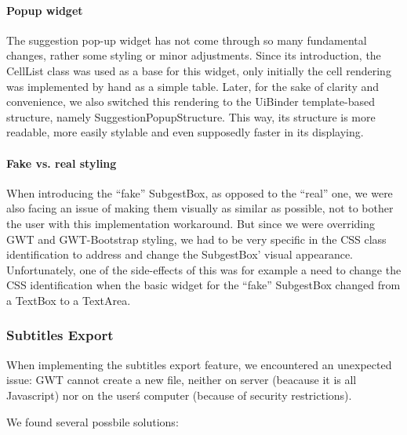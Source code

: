 \paragraph{Popup widget}
The suggestion pop-up widget has not come through so many fundamental changes, rather some styling or minor adjustments. Since its introduction, the CellList class was used as a base for this widget, only initially the cell rendering was implemented by hand as a simple table. Later, for the sake of clarity and convenience, we also switched this rendering to the UiBinder template-based structure, namely SuggestionPopupStructure. This way, its structure is more readable, more easily stylable and even supposedly faster in its displaying.

\paragraph{Fake vs. real styling}
When introducing the ``fake'' SubgestBox, as opposed to the ``real'' one, we were also facing an issue of making them visually as similar as possible, not to bother the user with this implementation workaround. But since we were overriding GWT and GWT-Bootstrap styling, we had to be very specific in the CSS class identification to address and change the SubgestBox' visual appearance. Unfortunately, one of the side-effects of this was for example a need to change the CSS identification when the basic widget for the ``fake'' SubgestBox changed from a TextBox to a TextArea.

\subsubsection{Subtitles Export}

When implementing the subtitles export feature, we encountered an unexpected issue:
GWT cannot create a new file, neither on server (beacause it is all Javascript) nor on the user\'s computer (because of security restrictions).

We found several possbile solutions:

